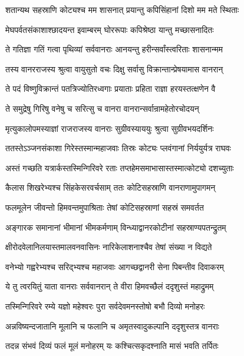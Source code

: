 \twolineshloka
{शतान्यथ सहस्राणि कोट्यश्च मम शासनात्}
{प्रयान्तु कपिसिंहानां दिशो मम मते स्थिताः} %

\twolineshloka
{मेघपर्वतसंकाशाश्छादयन्त इवाम्बरम्}
{घोररूपाः कपिश्रेष्ठा यान्तु मच्छासनादितः} %

\twolineshloka
{ते गतिज्ञा गतिं गत्वा पृथिव्यां सर्ववानराः}
{आनयन्तु हरीन्सर्वांस्त्वरिताः शासनान्मम} %

\twolineshloka
{तस्य वानरराजस्य श्रुत्वा वायुसुतो वचः}
{दिक्षु सर्वासु विक्रान्तान्प्रेषयामास वानरान्} %

\twolineshloka
{ते पदं विष्णुविक्रान्तं पतत्रिज्योतिरध्वगाः}
{प्रयाताः प्रहिता राज्ञा हरयस्तत्क्षणेन वै} %

\twolineshloka
{ते समुद्रेषु गिरिषु वनेषु च सरित्सु च}
{वानरा वानरान्सर्वान्रामहेतोरचोदयन्} %

\twolineshloka
{मृत्युकालोपमस्याज्ञां राजराजस्य वानराः}
{सुग्रीवस्याययुः श्रुत्वा सुग्रीवभयदर्शिनः} %

\twolineshloka
{ततस्तेऽञ्जनसंकाशा गिरेस्तस्मान्महाजवाः}
{तिस्रः कोट्यः प्लवंगानां निर्ययुर्यत्र राघवः} %

\twolineshloka
{अस्तं गच्छति यत्रार्कस्तस्मिन्गिरिवरे रताः}
{तप्तहेमसमाभासास्तस्मात्कोट्यो दशच्युताः} %

\twolineshloka
{कैलास शिखरेभ्यश्च सिंहकेसरवर्चसाम्}
{ततः कोटिसहस्राणि वानराणामुपागमन्} %

\twolineshloka
{फलमूलेन जीवन्तो हिमवन्तमुपाश्रिताः}
{तेषां कोटिसहस्राणां सहस्रं समवर्तत} %

\twolineshloka
{अङ्गारक समानानां भीमानां भीमकर्मणाम्}
{विन्ध्याद्वानरकोटीनां सहस्राण्यपतन्द्रुतम्} %

\twolineshloka
{क्षीरोदवेलानिलयास्तमालवनवासिनः}
{नारिकेलाशनाश्चैव तेषां संख्या न विद्यते} %

\twolineshloka
{वनेभ्यो गह्वरेभ्यश्च सरिद्भ्यश्च महाजवाः}
{आगच्छद्वानरी सेना पिबन्तीव दिवाकरम्} %

\twolineshloka
{ये तु त्वरयितुं याता वानराः सर्ववानरान्}
{ते वीरा हिमवच्छैलं ददृशुस्तं महाद्रुमम्} %

\twolineshloka
{तस्मिन्गिरिवरे रम्ये यज्ञो महेश्वरः पुरा}
{सर्वदेवमनस्तोषो बभौ दिव्यो मनोहरः} %

\twolineshloka
{अन्नविष्यन्दजातानि मूलानि च फलानि च}
{अमृतस्वादुकल्पानि ददृशुस्तत्र वानराः} %

\twolineshloka
{तदन्न संभवं दिव्यं फलं मूलं मनोहरम्}
{यः कश्चित्सकृदश्नाति मासं भवति तर्पितः} %

